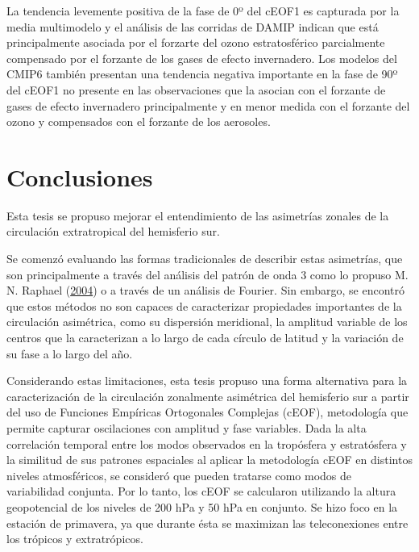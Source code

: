 \documentclass[12pt,oneside,a4paper]{reedthesis}
\begin{document}
La tendencia levemente positiva de la fase de 0º del cEOF1 es capturada por la media multimodelo y el análisis de las corridas de DAMIP indican que está principalmente asociada por el forzarte del ozono estratosférico parcialmente compensado por el forzante de los gases de efecto invernadero.
Los modelos del CMIP6 también presentan una tendencia negativa importante en la fase de 90º del cEOF1 no presente en las observaciones que la asocian con el forzante de gases de efecto invernadero principalmente y en menor medida con el forzante del ozono y compensados con el forzante de los aerosoles.

\hypertarget{conclusiones}{%
\chapter{Conclusiones}\label{conclusiones}}

Esta tesis se propuso mejorar el entendimiento de las asimetrías zonales de la circulación extratropical del hemisferio sur.

Se comenzó evaluando las formas tradicionales de describir estas asimetrías, que son principalmente a través del análisis del patrón de onda 3 como lo propuso M. N. Raphael (\protect\hyperlink{ref-raphael2004}{2004}) o a través de un análisis de Fourier.
Sin embargo, se encontró que estos métodos no son capaces de caracterizar propiedades importantes de la circulación asimétrica, como su dispersión meridional, la amplitud variable de los centros que la caracterizan a lo largo de cada círculo de latitud y la variación de su fase a lo largo del año.

Considerando estas limitaciones, esta tesis propuso una forma alternativa para la caracterización de la circulación zonalmente asimétrica del hemisferio sur a partir del uso de Funciones Empíricas Ortogonales Complejas (cEOF), metodología que permite capturar oscilaciones con amplitud y fase variables.
Dada la alta correlación temporal entre los modos observados en la tropósfera y estratósfera y la similitud de sus patrones espaciales al aplicar la metodología cEOF en distintos niveles atmosféricos, se consideró que pueden tratarse como modos de variabilidad conjunta.
Por lo tanto, los cEOF se calcularon utilizando la altura geopotencial de los niveles de 200 hPa y 50 hPa en conjunto.
Se hizo foco en la estación de primavera, ya que durante ésta se maximizan las teleconexiones entre los trópicos y extratrópicos.
\end{document}
